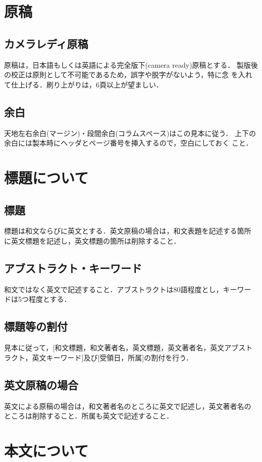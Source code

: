 \documentclass[a4j, 12Q, twocolumn, twoside]{jsarticle}
\begin{document}
\section{原稿}
\subsection{カメラレディ原稿}
原稿は，日本語もしくは英語による完全版下(camera ready)原稿とする．
製版後の校正は原則として不可能であるため，誤字や脱字がないよう，特に念
を入れて仕上げる．刷り上がりは，6頁以上が望ましい．

\subsection{余白}
天地左右余白(マージン)・段間余白(コラムスペース)はこの見本に従う．
上下の余白には製本時にヘッダとページ番号を挿入するので，空白にしておく
こと．

\section{標題について}
\subsection{標題}
標題は和文ならびに英文とする．英文原稿の場合は，和文表題を記述する箇所
に英文標題を記述し，英文標題の箇所は削除すること．

\subsection{アブストラクト・キーワード}
和文ではなく英文で記述すること．アブストラクトは80語程度とし，キーワー
ドは5つ程度とする．

\subsection{標題等の割付}
見本に従って，[和文標題，和文著者名，英文標題，英文著者名，英文アブスト
ラクト，英文キーワード]及び[受領日，所属]の割付を行う．

\subsection{英文原稿の場合}
英文による原稿の場合は，和文著者名のところに英文で記述し，英文著者名の
ところは削除すること．所属も英文で記述すること．

\section{本文について}
\end{document}
